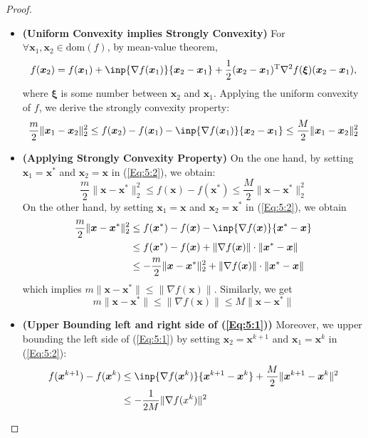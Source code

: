 \begin{proof}
\begin{itemize}
\item
\textbf{(Uniform Convexity implies Strongly Convexity)}
For $\forall \bm x_1,\bm x_2\in\text{dom}(f)$, by mean-value theorem,
\[
f(\bm x_2) = f(\bm x_1) + \inp{\nabla f(\bm x_1)}{\bm x_2-\bm x_1} + \frac{1}{2}(\bm x_2-\bm x_1)\trans\nabla^2f(\bm\xi)(\bm x_2-\bm x_1),
\]
where $\bm\xi$ is some number between $\bm x_2$ and $\bm x_1$. Applying the uniform convexity of $f$, we derive the strongly convexity property:
\begin{equation}\label{Eq:5:2}
\frac{m}{2}\|\bm x_1-\bm x_2\|_2^2\le f(\bm x_2)-f(\bm x_1) - \inp{\nabla f(\bm x_1)}{\bm x_2-\bm x_1}\le\frac{M}{2}\|\bm x_1-\bm x_2\|_2^2
\end{equation}
\item
\textbf{(Applying Strongly Convexity Property)}
On the one hand, by setting $\bm x_1 = \bm x^*$ and $\bm x_2 = \bm x$ in (\ref{Eq:5:2}), we obtain:
\begin{equation}
\frac{m}{2}\|\bm x-\bm x^*\|_2^2\le f(\bm x)-f(\bm x^*) \le\frac{M}{2}\|\bm x-\bm x^*\|_2^2
\end{equation}
On the other hand, by setting $\bm x_1 = \bm x$ and $\bm x_2 = \bm x^*$ in (\ref{Eq:5:2}), we obtain
\begin{align*}
\frac{m}{2}\|\bm x-\bm x^*\|_2^2&\le f(\bm x^*)-f(\bm x) - \inp{\nabla f(\bm x)}{\bm x^*-\bm x}\\
&\le f(\bm x^*)-f(\bm x) + \|\nabla f(\bm x)\|\cdot\|\bm x^*-\bm x\|\\
&\le -\frac{m}{2}\|\bm x-\bm x^*\|_2^2+\|\nabla f(\bm x)\|\cdot\|\bm x^*-\bm x\|
\end{align*}
which implies $m\|\bm x-\bm x^*\|\le\|\nabla f(\bm x)\|$. Similarly, we get
\begin{equation}
m\|\bm x-\bm x^*\|\le\|\nabla f(\bm x)\|\le M\|\bm x-\bm x^*\|
\end{equation}
\item
\textbf{(Upper Bounding left and right side of (\ref{Eq:5:1}))}
Moreover, we upper bounding the left side of (\ref{Eq:5:1}) by setting $\bm x_2 = \bm x^{k+1}$ and $\bm x_1 = \bm x^k$ in (\ref{Eq:5:2}):
\begin{equation}\label{Eq:5:5}
\begin{aligned}
f(\bm x^{k+1}) - f(\bm x^k)&\le \inp{\nabla f(\bm x^k)}{\bm x^{k+1} - \bm x^k}+\frac{M}{2}\|\bm x^{k+1}-\bm x^k\|^2\\
&\le-\frac{1}{2M}\|\nabla f(x^k)\|^2
\end{aligned}

\end{equation}
\end{itemize}
\end{proof}
